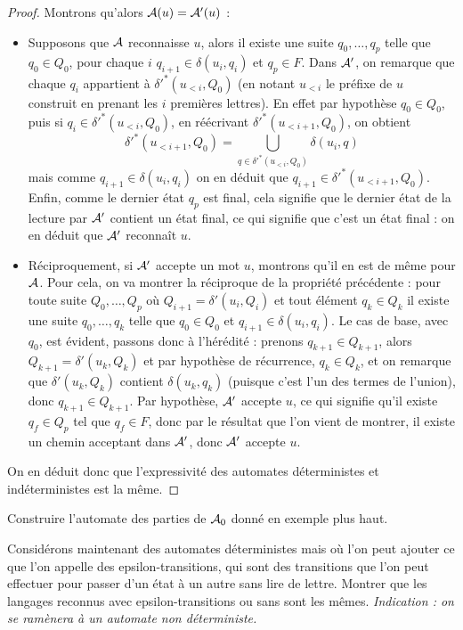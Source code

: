 \begin{proof}
    Montrons qu'alors $\mathcal A(u) = \mathcal A'(u)$ :
    \begin{itemize}[label=$\bullet$]
        \item Supposons que $\mathcal A$ reconnaisse $u$, alors il existe une suite $q_0,\ldots,q_p$ telle que $q_0\in Q_0$, pour chaque $i$ $q_{i+1}\in \delta(u_i,q_i)$ et $q_p\in F$. Dans $\mathcal A'$, on remarque que chaque $q_i$ appartient à $\delta'^*(u_{<i},Q_0)$ (en notant $u_{<i}$ le préfixe de $u$ construit en prenant les $i$ premières lettres). En effet par hypothèse $q_0\in Q_0$, puis si $q_i\in \delta'^*(u_{<i},Q_0)$, en réécrivant $\delta'^*(u_{<i+1},Q_0)$, on obtient $$\delta'^*(u_{<i+1},Q_0) = \bigcup_{q \in \delta'^*(u_{<i},Q_0)} \delta(u_i,q)$$ mais comme $q_{i+1}\in \delta(u_i,q_i)$ on en déduit que $q_{i+1}\in \delta'^*(u_{<i+1},Q_0)$. Enfin, comme le dernier état $q_p$ est final, cela signifie que le dernier état de la lecture par $\mathcal A'$ contient un état final, ce qui signifie que c'est un état final : on en déduit que $\mathcal A'$ reconnaît $u$.
        \item Réciproquement, si $\mathcal A'$ accepte un mot $u$, montrons qu'il en est de même pour $\mathcal A$. Pour cela, on va montrer la réciproque de la propriété précédente : pour toute suite $Q_0,\ldots,Q_p$ où $Q_{i+1}=\delta'(u_i,Q_i)$ et tout élément $q_{k}\in Q_{k}$ il existe une suite $q_0,\ldots,q_k$ telle que $q_0\in Q_0$ et $q_{i+1}\in \delta(u_i,q_i)$. Le cas de base, avec $q_0$, est évident, passons donc à l'hérédité : prenons $q_{k+1}\in Q_{k+1}$, alors $Q_{k+1}=\delta'(u_k,Q_k)$ et par hypothèse de récurrence, $q_k\in Q_k$, et on remarque que $\delta'(u_k,Q_k)$ contient $\delta(u_k,q_k)$ (puisque c'est l'un des termes de l'union), donc $q_{k+1}\in Q_{k+1}$. Par hypothèse, $\mathcal A'$ accepte $u$, ce qui signifie qu'il existe $q_f\in Q_p$ tel que $q_f \in F$, donc par le résultat que l'on vient de montrer, il existe un chemin acceptant dans $\mathcal A'$, donc $\mathcal A'$ accepte $u$.
    \end{itemize}
    On en déduit donc que l'expressivité des automates déterministes et indéterministes est la même.
 \end{proof}

 \begin{exo}
     Construire l'automate des parties de $\mathcal A_0$ donné en exemple plus haut.
 \end{exo}

 \begin{exo}
     Considérons maintenant des automates déterministes mais où l'on peut ajouter ce que l'on appelle des \og epsilon-transitions\fg{}, qui sont des transitions que l'on peut effectuer pour passer d'un état à un autre sans lire de lettre. Montrer que les langages reconnus avec epsilon-transitions ou sans sont les mêmes. \textit{Indication : on se ramènera à un automate non déterministe.}
 \end{exo}

